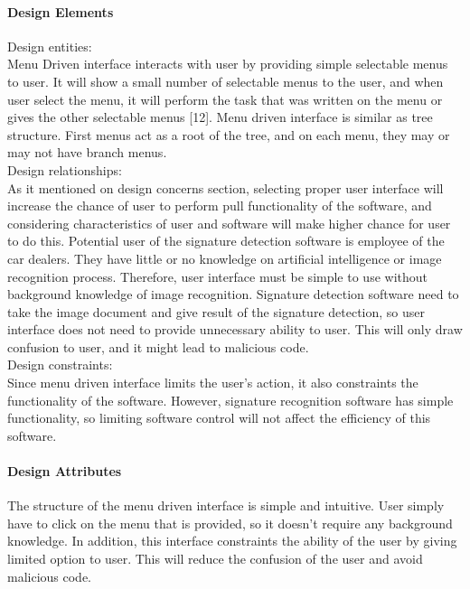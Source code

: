 \documentclass[article, onecolumn, draftclsnofoot,10pt, compsoc]{IEEEtran}
\begin{document}
\paragraph{Design Elements}
Design entities: \\
Menu Driven interface interacts with user by providing simple selectable menus to user. It will show a small number of selectable menus to the user, and when user select the menu, it will perform the task that was written on the menu or gives the other selectable menus [12]. Menu driven interface is similar as tree structure. First menus act as a root of the tree, and on each menu, they may or may not have branch menus.\\

Design relationships:\\
As it mentioned on design concerns section, selecting proper user interface will increase the chance of user to perform pull functionality of the software, and considering characteristics of user and software will make higher chance for user to do this. Potential user of the signature detection software is employee of the car dealers. They have little or no knowledge on artificial intelligence or image recognition process. Therefore, user interface must be simple to use without background knowledge of image recognition. Signature detection software need to take the image document and give result of the signature detection, so user interface does not need to provide unnecessary ability to user. This will only draw confusion to user, and it might lead to malicious code.\\

Design constraints:\\
Since menu driven interface limits the user’s action, it also constraints the functionality of the software. However, signature recognition software has simple functionality, so limiting software control will not affect the efficiency of this software.\\

\paragraph{Design Attributes}
The structure of the menu driven interface is simple and intuitive. User simply have to click on the menu that is provided, so it doesn’t require any background knowledge. In addition, this interface constraints the ability of the user by giving limited option to user. This will reduce the confusion of the user and avoid malicious code.
\end{document}
